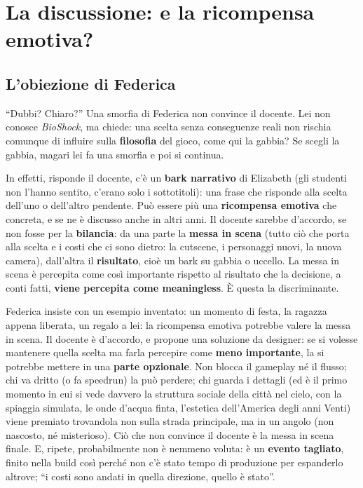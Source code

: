 \section{La discussione: e la ricompensa emotiva?}
\label{gd15:sec:discussione}

\subsection{L'obiezione di Federica}

``Dubbi? Chiaro?'' Una smorfia di Federica non convince il docente. Lei non
conosce \emph{BioShock}, ma chiede: una scelta senza conseguenze reali non
rischia comunque di influire sulla \textbf{filosofia} del gioco, come qui la
gabbia? Se scegli la gabbia, magari lei fa una smorfia e poi si continua.

In effetti, risponde il docente, c'è un \textbf{bark narrativo} di Elizabeth
(gli studenti non l'hanno sentito, c'erano solo i sottotitoli): una frase che
risponde alla scelta dell'uno o dell'altro pendente. Può essere più una
\textbf{ricompensa emotiva} che concreta, e se ne è discusso anche in altri
anni. Il docente sarebbe d'accordo, se non fosse per la \textbf{bilancia}:
da una parte la \textbf{messa in scena} (tutto ciò che porta alla scelta e i
costi che ci sono dietro: la cutscene, i personaggi nuovi, la nuova camera),
dall'altra il \textbf{risultato}, cioè un bark su gabbia o uccello. La messa
in scena è percepita come così importante rispetto al risultato che la
decisione, a conti fatti, \textbf{viene percepita come meaningless}. È questa
la discriminante.

Federica insiste con un esempio inventato: un momento di festa, la ragazza
appena liberata, un regalo a lei: la ricompensa emotiva potrebbe valere la
messa in scena. Il docente è d'accordo, e propone una soluzione da designer:
se si volesse mantenere quella scelta ma farla percepire come \textbf{meno
importante}, la si potrebbe mettere in una \textbf{parte opzionale}. Non
blocca il gameplay né il flusso; chi va dritto (o fa speedrun) la può
perdere; chi guarda i dettagli (ed è il primo momento in cui si vede
davvero la struttura sociale della città nel cielo, con la spiaggia
simulata, le onde d'acqua finta, l'estetica dell'America degli anni
Venti) viene premiato trovandola non sulla strada principale, ma in un
angolo (non nascosto, né misterioso). Ciò che non convince il docente è la
messa in scena finale. E, ripete, probabilmente non è nemmeno voluta: è un
\textbf{evento tagliato}, finito nella build così perché non c'è stato tempo
di produzione per espanderlo altrove; ``i costi sono andati in quella
direzione, quello è stato''.

